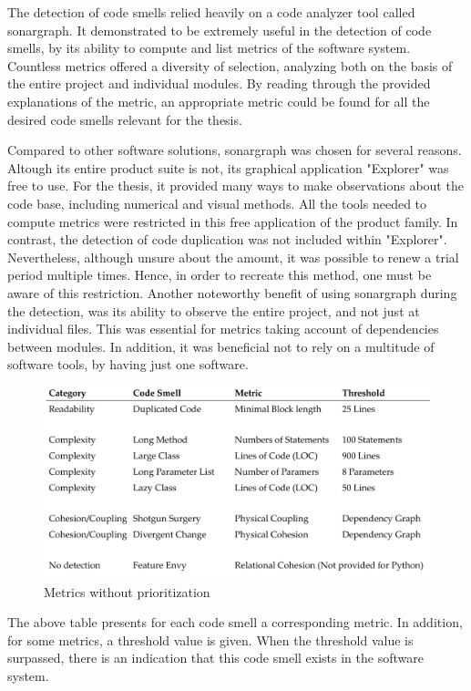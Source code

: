 The detection of code smells relied heavily on a code analyzer tool called sonargraph. It demonstrated to be extremely useful in the detection of code smells, by its ability to compute and list metrics of the software system. Countless metrics offered a diversity of selection, analyzing both on the basis of the entire project and individual modules. By reading through the provided explanations of the metric, an appropriate metric could be found for all the desired code smells relevant for the thesis.

Compared to other software solutions, sonargraph was chosen for several reasons. Altough its entire product suite is not, its graphical application "Explorer" was free to use. For the thesis, it provided many ways to make observations about the code base, including numerical and visual methods. All the tools needed to compute metrics were restricted in this free application of the product family. In contrast, the detection of code duplication was not included within "Explorer". Nevertheless, although unsure about the amount, it was possible to renew a trial period multiple times. Hence, in order to recreate this method, one must be aware of this restriction. Another noteworthy benefit of using sonargraph during the detection, was its ability to observe the entire project,  and not just at individual files. This was essential for metrics taking account of dependencies between modules. In addition, it was beneficial not to rely on a multitude of software tools, by having just one software.



\begin{figure}[htp]
    \centering
    \includegraphics[width=\textwidth]{./assets/smell_overview}
    \caption{Metrics without prioritization}
\end{figure}
The above table presents for each code smell a corresponding metric. In addition, for some metrics, a threshold value is given. When the threshold value is surpassed, there is an indication that this code smell exists in the software system.

